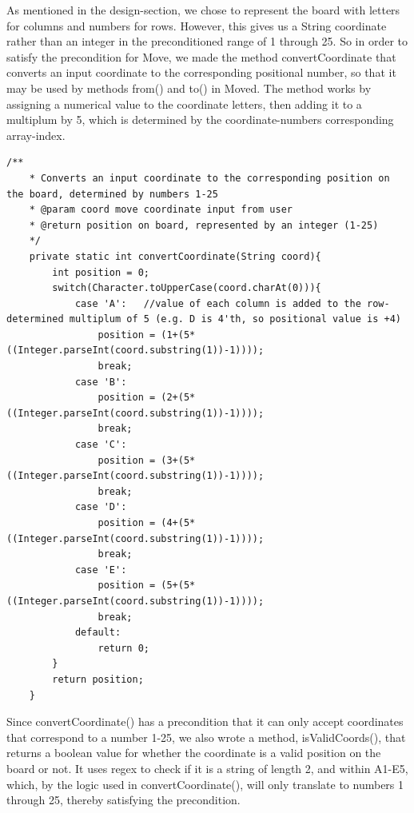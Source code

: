 \documentclass[12pt, a4paper]{article}
\begin{document}
As mentioned in the design-section, we chose to represent the board with letters for columns and numbers for rows. However, this gives us a String coordinate rather than an integer in the preconditioned range of 1 through 25. So in order to satisfy the precondition for Move, we made the method convertCoordinate that converts an input coordinate to the corresponding positional number, so that it may be used by methods from() and to() in Moved.
The method works by assigning a numerical value to the coordinate letters, then adding it to a multiplum by 5, which is determined by the coordinate-numbers corresponding array-index.
\\
\begin{lstlisting}[style=JavaStyle]
    /**
    * Converts an input coordinate to the corresponding position on the board, determined by numbers 1-25
    * @param coord move coordinate input from user
    * @return position on board, represented by an integer (1-25)
    */
    private static int convertCoordinate(String coord){
        int position = 0;
        switch(Character.toUpperCase(coord.charAt(0))){
            case 'A':   //value of each column is added to the row-determined multiplum of 5 (e.g. D is 4'th, so positional value is +4)
                position = (1+(5*((Integer.parseInt(coord.substring(1))-1))));
                break;
            case 'B':
                position = (2+(5*((Integer.parseInt(coord.substring(1))-1))));
                break;
            case 'C':
                position = (3+(5*((Integer.parseInt(coord.substring(1))-1))));
                break;
            case 'D':
                position = (4+(5*((Integer.parseInt(coord.substring(1))-1))));
                break;
            case 'E':
                position = (5+(5*((Integer.parseInt(coord.substring(1))-1))));
                break;
            default:
                return 0;
        }
        return position;
    }
\end{lstlisting}

Since convertCoordinate() has a precondition that it can only accept coordinates that correspond to a number 1-25, we also wrote a method, isValidCoords(), that returns a boolean value for whether the coordinate is a valid position on the board or not. It uses regex to check if it is a string of length 2, and within A1-E5, which, by the logic used in convertCoordinate(), will only translate to numbers 1 through 25, thereby satisfying the precondition.
\end{document}
